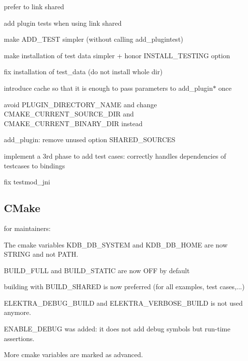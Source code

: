 \begin{DoxyItemize}
\item prefer to link shared
\item add plugin tests when using link shared
\item make A\+D\+D\+\_\+\+T\+E\+ST simpler (without calling add\+\_\+plugintest)
\item make installation of test data simpler + honor I\+N\+S\+T\+A\+L\+L\+\_\+\+T\+E\+S\+T\+I\+NG option
\item fix installation of test\+\_\+data (do not install whole dir)
\item introduce cache so that it is enough to pass parameters to add\+\_\+plugin$\ast$ once
\item avoid P\+L\+U\+G\+I\+N\+\_\+\+D\+I\+R\+E\+C\+T\+O\+R\+Y\+\_\+\+N\+A\+ME and change C\+M\+A\+K\+E\+\_\+\+C\+U\+R\+R\+E\+N\+T\+\_\+\+S\+O\+U\+R\+C\+E\+\_\+\+D\+IR and C\+M\+A\+K\+E\+\_\+\+C\+U\+R\+R\+E\+N\+T\+\_\+\+B\+I\+N\+A\+R\+Y\+\_\+\+D\+IR instead
\item add\+\_\+plugin\+: remove unused option S\+H\+A\+R\+E\+D\+\_\+\+S\+O\+U\+R\+C\+ES
\item implement a 3rd phase to add test cases\+: correctly handles dependencies of testcases to bindings
\item fix testmod\+\_\+jni
\end{DoxyItemize}

\subsection*{C\+Make}

for maintainers\+:


\begin{DoxyItemize}
\item The cmake variables K\+D\+B\+\_\+\+D\+B\+\_\+\+S\+Y\+S\+T\+EM and K\+D\+B\+\_\+\+D\+B\+\_\+\+H\+O\+ME are now S\+T\+R\+I\+NG and not P\+A\+TH.
\item B\+U\+I\+L\+D\+\_\+\+F\+U\+LL and B\+U\+I\+L\+D\+\_\+\+S\+T\+A\+T\+IC are now O\+FF by default
\item building with B\+U\+I\+L\+D\+\_\+\+S\+H\+A\+R\+ED is now preferred (for all examples, test cases,...)
\item E\+L\+E\+K\+T\+R\+A\+\_\+\+D\+E\+B\+U\+G\+\_\+\+B\+U\+I\+LD and E\+L\+E\+K\+T\+R\+A\+\_\+\+V\+E\+R\+B\+O\+S\+E\+\_\+\+B\+U\+I\+LD is not used anymore.
\item E\+N\+A\+B\+L\+E\+\_\+\+D\+E\+B\+UG was added\+: it does not add debug symbols but run-\/time assertions.
\item More cmake variables are marked as advanced.
\end{DoxyItemize}

